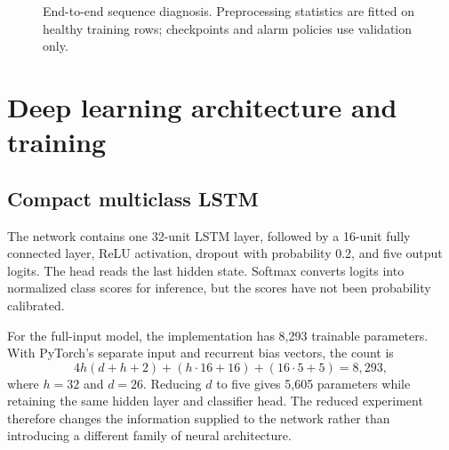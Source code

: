 \begin{figure}[htbp]
\centering
{}
\caption{End-to-end sequence diagnosis. Preprocessing statistics are fitted on healthy training rows; checkpoints and alarm policies use validation only.}
\label{fig:pipeline}
\end{figure}

\section{Deep learning architecture and training}
\subsection{Compact multiclass LSTM}
The network contains one 32-unit LSTM layer, followed by a 16-unit fully connected layer, ReLU activation, dropout with probability 0.2, and five output logits. The head reads the last hidden state. Softmax converts logits into normalized class scores for inference, but the scores have not been probability calibrated.

For the full-input model, the implementation has 8,293 trainable parameters. With PyTorch's separate input and recurrent bias vectors, the count is
\begin{equation}
4h(d+h+2)+(h\cdot16+16)+(16\cdot5+5)=8,293,
\end{equation}
where $h=32$ and $d=26$. Reducing $d$ to five gives 5,605 parameters while retaining the same hidden layer and classifier head. The reduced experiment therefore changes the information supplied to the network rather than introducing a different family of neural architecture.


